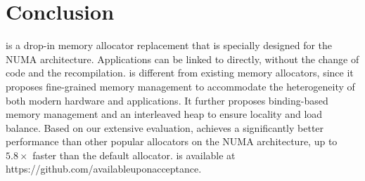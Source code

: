 \section{Conclusion}
\label{sec:conclusion}

\NM{} is a drop-in memory allocator replacement that is specially designed for the NUMA architecture. Applications can be linked to \NM{} directly, without the change of code and the recompilation. \NM{} is different from existing memory allocators, since it proposes  fine-grained memory management to accommodate the heterogeneity of both modern hardware and applications. It further proposes binding-based memory management and an interleaved heap to ensure locality and load balance. 
Based on our extensive evaluation, \NM{} achieves a significantly better performance than other popular allocators on the NUMA architecture, up to $5.8\times$ faster than the default allocator.  \NM{} is available at https://github.com/availableuponacceptance. 